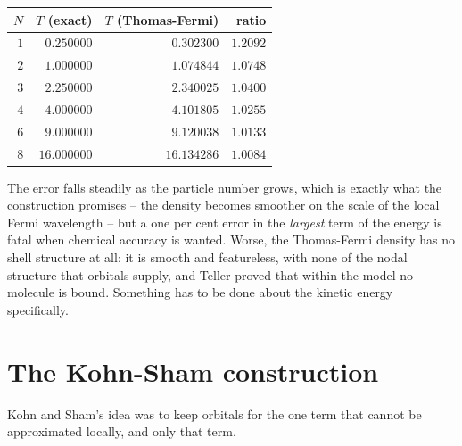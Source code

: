 \begin{center}
\renewcommand{\arraystretch}{1.2}
\setlength{\tabcolsep}{11pt}
\begin{tabular}{rrrr}
\toprule
$N$ & $T$ (exact) & $T$ (Thomas-Fermi) & ratio\\
\midrule
$1$ & $0.250000$  & $0.302300$  & $1.2092$\\
$2$ & $1.000000$  & $1.074844$  & $1.0748$\\
$3$ & $2.250000$  & $2.340025$  & $1.0400$\\
$4$ & $4.000000$  & $4.101805$  & $1.0255$\\
$6$ & $9.000000$  & $9.120038$  & $1.0133$\\
$8$ & $16.000000$ & $16.134286$ & $1.0084$\\
\bottomrule
\end{tabular}
\end{center}

The error falls steadily as the particle number grows, which is exactly what
the construction promises -- the density becomes smoother on the scale of the
local Fermi wavelength -- but a one per cent error in the \emph{largest} term
of the energy is fatal when chemical accuracy is wanted.  Worse, the
Thomas-Fermi density has no shell structure at all: it is smooth and
featureless, with none of the nodal structure that orbitals supply, and
Teller proved that within the model no molecule is bound.  Something has to
be done about the kinetic energy specifically.

\section{The Kohn-Sham construction}
\label{sec:kohnsham}

Kohn and Sham's idea was to keep orbitals for the one term that cannot be
approximated locally, and only that term.

